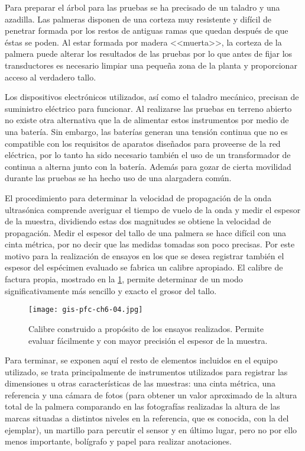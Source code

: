 Para preparar el árbol para las pruebas se ha precisado de un taladro y una
azadilla. Las palmeras disponen de una corteza muy resistente y difícil de
penetrar formada por los restos de antiguas ramas que quedan después de que
éstas se poden. Al estar formada por madera <<muerta>>, la corteza de la
palmera puede alterar los resultados de las pruebas por lo que antes de
fijar los transductores es necesario limpiar una pequeña zona de la planta
y proporcionar acceso al verdadero tallo.

Los dispositivos electrónicos utilizados, así como el taladro mecánico,
precisan de suministro eléctrico para funcionar. Al realizarse las pruebas
en terreno abierto no existe otra alternativa que la de alimentar estos
instrumentos por medio de una batería. Sin embargo, las baterías generan
una tensión continua que no es compatible con los requisitos de aparatos
diseñados para proveerse de la red eléctrica, por lo tanto ha sido
necesario también el uso de un transformador de continua a alterna junto
con la batería. Además para gozar de cierta movilidad durante las pruebas
se ha hecho uso de una alargadera común.

\sshortpage{}

El procedimiento para determinar la velocidad de propagación de la onda
ultrasónica comprende averiguar el tiempo de vuelo de la onda y medir el
espesor de la muestra, dividiendo estas dos magnitudes se obtiene la
velocidad de propagación. Medir el espesor del tallo de una palmera se hace
difícil con una cinta métrica, por no decir que las medidas tomadas son
poco precisas. Por este motivo para la realización de ensayos en los que se
desea registrar también el espesor del espécimen evaluado se fabrica un
calibre apropiado. El calibre de factura propia, mostrado en la
\cref{fig:calibre}, permite determinar de un modo significativamente más
sencillo y exacto el grosor del tallo.

\begin{figure}
    \begin{center}
	\texttt{[image: gis-pfc-ch6-04.jpg]}
    \end{center}
    \caption[Calibre en los ensayos]{Calibre construido a propósito de los
    ensayos realizados. Permite evaluar fácilmente y con mayor precisión el
    espesor de la muestra.}
    \label{fig:calibre}
\end{figure}

Para terminar, se exponen aquí el resto de elementos incluidos en el equipo
utilizado, se trata principalmente de instrumentos utilizados para
registrar las dimensiones u otras características de las muestras: una
cinta métrica, una referencia y una cámara de fotos (para obtener un valor
aproximado de la altura total de la palmera comparando en las fotografías
realizadas la altura de las marcas situadas a distintos niveles en la
referencia, que es conocida, con la del ejemplar), un martillo para
percutir el sensor y en último lugar, pero no por ello menos importante,
bolígrafo y papel para realizar anotaciones.


